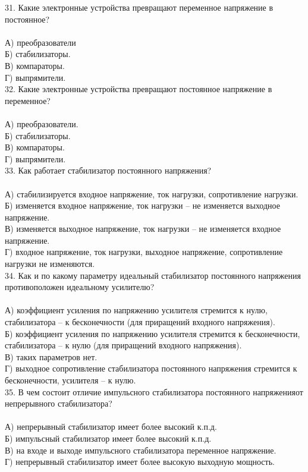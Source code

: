 31. Какие электронные устройства превращают переменное напряжение в постоянное?\\\\
А) преобразователи\\
Б) стабилизаторы.\\
В) компараторы.\\
Г) выпрямители.\\

32. Какие электронные устройства превращают постоянное напряжение в переменное?\\\\
А) преобразователи.\\
Б) стабилизаторы.\\
В) компараторы.\\
Г) выпрямители.\\

33. Как работает стабилизатор постоянного напряжения?\\\\
А) стабилизируется входное напряжение, ток нагрузки, сопротивление нагрузки.\\
Б) изменяется входное напряжение, ток нагрузки – не изменяется выходное напряжение. \\
В) изменяется выходное напряжение, ток нагрузки – не изменяется входное напряжение.\\
Г) входное напряжение, ток нагрузки, выходное напряжение, сопротивление нагрузки не изменяются. \\

34. Как и по какому параметру идеальный стабилизатор постоянного напряжения противоположен идеальному усилителю?\\\\
А) коэффициент усиления по напряжению усилителя стремится к нулю, стабилизатора – к бесконечности (для приращений входного напряжения). \\
Б) коэффициент усиления по напряжению усилителя стремится к бесконечности, стабилизатора – к нулю (для приращений входного напряжения).\\
В) таких параметров нет.\\
Г) выходное сопротивление стабилизатора постоянного напряжения стремится к бесконечности, усилителя – к нулю.\\

35. В чем состоит отличие импульсного стабилизатора постоянного напряженияот непрерывного стабилизатора?\\\\
А) непрерывный стабилизатор имеет более высокий к.п.д.\\
Б) импульсный стабилизатор имеет более высокий к.п.д.\\
В) на входе и выходе импульсного стабилизатора переменное напряжение.\\
Г) непрерывный стабилизатор имеет более высокую выходную мощность.\\
